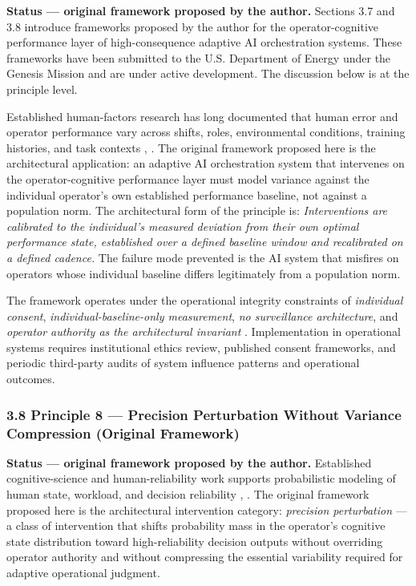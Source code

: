 \textbf{Status --- original framework proposed by the author.} Sections
3.7 and 3.8 introduce frameworks proposed by the author for the
operator-cognitive performance layer of high-consequence adaptive AI
orchestration systems. These frameworks have been submitted to the U.S.
Department of Energy under the Genesis Mission \cite{ref2} and are under
active development. The discussion below is at the principle level.

Established human-factors research has long documented that human error
and operator performance vary across shifts, roles, environmental
conditions, training histories, and task contexts \cite{ref13}, \cite{ref14}.
The original framework proposed here is the architectural application:
an adaptive AI orchestration system that intervenes on the
operator-cognitive performance layer must model variance against the
individual operator's own established performance baseline, not against
a population norm. The architectural form of the principle is:
\emph{Interventions are calibrated to the individual's measured
deviation from their own optimal performance state, established over a
defined baseline window and recalibrated on a defined cadence.} The
failure mode prevented is the AI system that misfires on operators whose
individual baseline differs legitimately from a population norm.

The framework operates under the operational integrity constraints of
\emph{individual consent}, \emph{individual-baseline-only measurement},
\emph{no surveillance architecture}, and \emph{operator authority as the
architectural invariant} \cite{ref1}. Implementation in operational systems
requires institutional ethics review, published consent frameworks, and
periodic third-party audits of system influence patterns and operational
outcomes.

\subsubsection{3.8 Principle 8 --- Precision Perturbation Without
Variance Compression (Original
Framework)}\label{principle-8-precision-perturbation-without-variance-compression-original-framework}

\textbf{Status --- original framework proposed by the author.}
Established cognitive-science and human-reliability work supports
probabilistic modeling of human state, workload, and decision
reliability \cite{ref3}, \cite{ref12}. The original framework proposed here is
the architectural intervention category: \emph{precision perturbation}
--- a class of intervention that shifts probability mass in the
operator's cognitive state distribution toward high-reliability decision
outputs without overriding operator authority and without compressing
the essential variability required for adaptive operational judgment.

